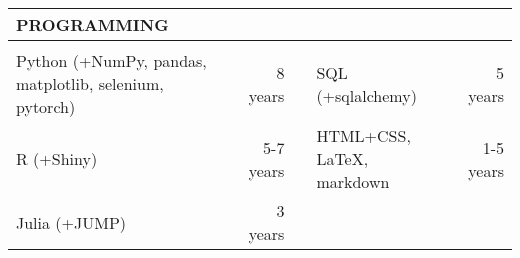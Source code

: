 \documentclass[a4paper,11pt,oneside]{article}
\begin{document}
\vspace{14pt}
\noindent \begin{tabularx}{\textwidth}{W{0.366} R{0.1} W{0.01} X R{0.1}}
    PROGRAMMING \\
    \midrule \\[-10pt]
    Python (+NumPy, pandas, matplotlib, selenium, pytorch) & 8 years & & SQL (+sqlalchemy) & 5 years \\[.4ex]
    R (+Shiny) & 5-7 years & & HTML+CSS, \LaTeX, markdown & 1-5 years \\[.4ex]
    Julia (+JUMP) & 3 years
\end{tabularx}


\vspace{12pt}
\end{document}

